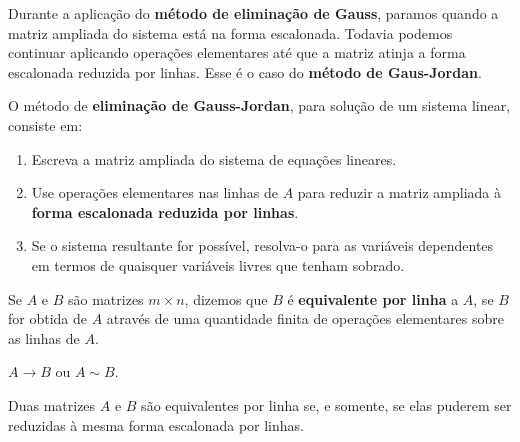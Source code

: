 \documentclass{beamer}
\begin{document}
    \begin{frame}
        Durante a aplicação do \textbf{método de eliminação de Gauss}, \pause paramos quando a matriz ampliada do sistema está na forma escalonada. \pause
        Todavia podemos continuar aplicando operações elementares \pause até que a matriz atinja a forma escalonada reduzida por linhas. \pause Esse é o caso do
        \textbf{método de Gaus-Jordan}.\pause

        \begin{definicao}
            O método de \textbf{eliminação de Gauss-Jordan}, \pause para solução de um sistema linear, consiste em:\pause
            \begin{enumerate}[label={\roman*})]
                \item Escreva a matriz ampliada do sistema de equações lineares.\pause

                \item Use operações elementares nas linhas de $A$ \pause para reduzir a matriz ampliada à \textbf{forma escalonada reduzida por linhas}.\pause

                \item Se o sistema resultante for possível, resolva-o para as variáveis dependentes em termos de quaisquer variáveis livres que tenham sobrado.
            \end{enumerate}
        \end{definicao}
    \end{frame}

    \begin{frame}
        \begin{definicao}
            Se $A$ e $B$ são matrizes $m \times n$, \pause dizemos que $B$ é \textbf{equivalente por linha} \pause a $A$, \pause se $B$ for obtida de $A$ \pause através de uma quantidade finita de operações elementares sobre as linhas de $A$.\pause
        \end{definicao}

        \vspace{.6cm}

        \begin{notacao}
            $A \rightarrow B$ \pause ou $A \sim B$.
        \end{notacao}
    \end{frame}

    \begin{frame}
        \begin{teorema}
            Duas matrizes $A$ e $B$ são equivalentes por linha \pause se, e somente, se elas puderem ser reduzidas à mesma forma escalonada por linhas.
        \end{teorema}
    \end{frame}
\end{document}
